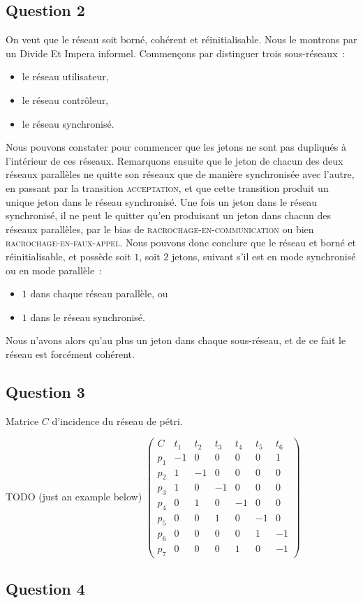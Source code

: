 \subsection*{Question 2}

On veut que le réseau soit borné, cohérent et réinitialisable. Nous le
montrons par un Divide Et Impera informel. Commençons par distinguer
trois sous-réseaux~:
\begin{itemize}
\item le réseau utilisateur,
\item le réseau contrôleur,
\item le réseau synchronisé.
\end{itemize}


Nous pouvons constater pour commencer que les jetons ne sont pas
dupliqués à l'intérieur de ces réseaux. Remarquons ensuite que le
jeton de chacun des deux réseaux parallèles ne quitte son réseaux
que de manière synchronisée avec l'autre, en passant par la transition
\textsc{acceptation}, et que cette transition produit un unique jeton
dans le réseau synchronisé.
Une fois un jeton dans le réseau synchronisé, il ne peut le quitter
qu'en produisant un jeton dans chacun des réseaux parallèles, par le
bias de \textsc{racrochage-en-communication} ou bien
\textsc{racrochage-en-faux-appel}.
Nous pouvons donc conclure que le réseau et borné et réinitialisable,
et possède soit $1$, soit $2$ jetons, suivant s'il est en mode synchronisé ou en mode parallèle~:
\begin{itemize}
\item $1$ dans chaque réseau parallèle, ou 
\item $1$ dans le réseau synchronisé.
\end{itemize} 
Nous n'avons alors qu'au plus un jeton dans chaque sous-réseau, et de
ce fait le réseau est forcément cohérent.

\subsection*{Question 3}

Matrice $C$ d'incidence du réseau de pétri.

TODO (just an example below)
 $ \begin{pmatrix}
C&t_1&t_2&t_3&t_4&t_5&t_6 \\
p_1& -1&0&0&0&0&1 \\
p_2&1&-1&0&0&0&0 \\
p_3&1&0&-1&0&0&0 \\
p_4&0&1&0&-1&0&0 \\
p_5&0&0&1&0&-1&0 \\
p_6&0&0&0&0&1&-1 \\
p_7&0&0&0&1&0&-1 
\end{pmatrix}$
\subsection*{Question 4}
